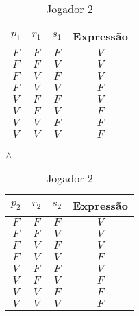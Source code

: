 \documentclass[a4paper,12pt]{article}
\begin{document}
\begin{enumerate}
\begin{enumerate}
 \begin{table}[htb]
 \begin{center}
 \begin{minipage}{0.4\linewidth}
 \centering
 \begin{tabular}{|c|c|c|c|}
  \hline
  \rowcolor[rgb]{0.9,0.9,0.9} { $p_1$} & { $r_1$} & { $s_1$} & {\bf Expressão} \\ \hline
  \rowcolor[rgb]{1,0.2,0.2} $F$   & $F$   & $F$   & $V$ \\ \hline
  \rowcolor[rgb]{1,0.2,0.2} $F$   & $F$   & $V$   & $V$ \\ \hline
  \rowcolor[rgb]{1,0.2,0.2} $F$   & $V$   & $F$   & $V$ \\ \hline
   $F$   & $V$   & $V$   & $F$ \\ \hline
  \rowcolor[rgb]{1,0.2,0.2} $V$   & $F$   & $F$   & $V$ \\ \hline
   $V$   & $F$   & $V$   & $F$ \\ \hline
   $V$   & $V$   & $F$   & $F$ \\ \hline
   $V$   & $V$   & $V$   & $F$ \\ \hline
 \end{tabular}
 \caption{Jogador 1}
 \label{4b1}
 \end{minipage}
 $\wedge$
 \begin{minipage}{0.4\linewidth}
 \centering
 \begin{tabular}{|c|c|c|c|}
  \hline
  \rowcolor[rgb]{0.9,0.9,0.9} { $p_2$} & { $r_2$} & { $s_2$} & {\bf Expressão} \\ \hline
  \rowcolor[rgb]{1,0.2,0.2} $F$   & $F$   & $F$   & $V$ \\ \hline
  \rowcolor[rgb]{1,0.2,0.2} $F$   & $F$   & $V$   & $V$ \\ \hline
  \rowcolor[rgb]{1,0.2,0.2} $F$   & $V$   & $F$   & $V$ \\ \hline
   $F$   & $V$   & $V$   & $F$ \\ \hline
  \rowcolor[rgb]{1,0.2,0.2} $V$   & $F$   & $F$   & $V$ \\ \hline
   $V$   & $F$   & $V$   & $F$ \\ \hline
   $V$   & $V$   & $F$   & $F$ \\ \hline
   $V$   & $V$   & $V$   & $F$ \\ \hline
 \end{tabular}
 \caption{Jogador 2}
 \label{4b2}
 \end{minipage}
 \end{center}
\end{table}


\end{enumerate}
\end{enumerate}
\end{document}
